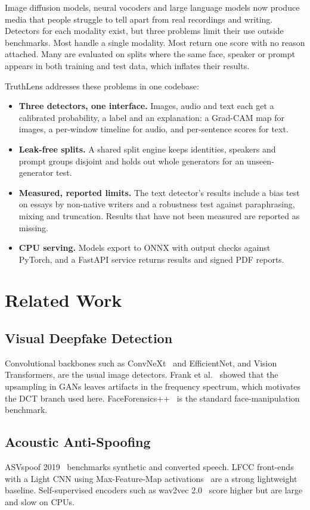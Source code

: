 \documentclass[conference]{IEEEtran}
\begin{document}
Image diffusion models, neural vocoders and large language models now produce media that people struggle to tell apart from real recordings and writing. Detectors for each modality exist, but three problems limit their use outside benchmarks. Most handle a single modality. Most return one score with no reason attached. Many are evaluated on splits where the same face, speaker or prompt appears in both training and test data, which inflates their results.

TruthLens addresses these problems in one codebase:
\begin{itemize}
    \item \textbf{Three detectors, one interface.} Images, audio and text each get a calibrated probability, a label and an explanation: a Grad-CAM map for images, a per-window timeline for audio, and per-sentence scores for text.
    \item \textbf{Leak-free splits.} A shared split engine keeps identities, speakers and prompt groups disjoint and holds out whole generators for an unseen-generator test.
    \item \textbf{Measured, reported limits.} The text detector's results include a bias test on essays by non-native writers and a robustness test against paraphrasing, mixing and truncation. Results that have not been measured are reported as missing.
    \item \textbf{CPU serving.} Models export to ONNX with output checks against PyTorch, and a FastAPI service returns results and signed PDF reports.
\end{itemize}

\section{Related Work}

\subsection{Visual Deepfake Detection}
Convolutional backbones such as ConvNeXt~\cite{liu2022convnet} and EfficientNet, and Vision Transformers, are the usual image detectors. Frank et al.~\cite{frank2020leveraging} showed that the upsampling in GANs leaves artifacts in the frequency spectrum, which motivates the DCT branch used here. FaceForensics++~\cite{rossler2019faceforensics} is the standard face-manipulation benchmark.

\subsection{Acoustic Anti-Spoofing}
ASVspoof 2019~\cite{todisco2019asvspoof} benchmarks synthetic and converted speech. LFCC front-ends with a Light CNN using Max-Feature-Map activations~\cite{wu2018lcnn} are a strong lightweight baseline. Self-supervised encoders such as wav2vec 2.0~\cite{baevski2020wav2vec} score higher but are large and slow on CPUs.
\end{document}
